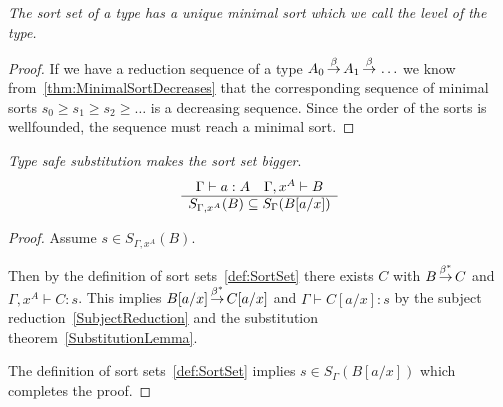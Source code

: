 \begin{theorem}
    \emph{The sort set of a type has a unique minimal sort which we call the
    level of the type.}

    \begin{proof}
        If we have a reduction sequence of a type $A_0 {\,\stackrel{\beta}{\to}\,} A_1 {\,\stackrel{\beta}{\to}\,}
        \ldots$ we know from~\ref{thm:MinimalSortDecreases} that the
        corresponding sequence of minimal sorts $s_0 \ge s_1 \ge s_2 \ge
        \ldots$ is a decreasing sequence. Since the order of the sorts is
        wellfounded, the sequence must reach a minimal sort.
    \end{proof}
\end{theorem}


\begin{theorem}
    \label{thm:SortSetSubstitution}
    \emph{Type safe substitution makes the sort set bigger}.
    $$
        \begin{array}{c} 
            \Gamma \vdash a : A \quad \Gamma,x^A \vdash B
         \\ \hline 
            S_{\Gamma,x^A}(B) \subseteq S_\Gamma(B[a/x])
        \end{array}
    $$
    \begin{proof}
        Assume $s \in S_{\Gamma,x^A}(B)$.

        Then by the definition of sort sets~\ref{def:SortSet}
        there exists $C$ with $B {\,\stackrel{\beta^*}{\to}\,} C$ and $\Gamma,x^A \vdash C: s$.
        This implies $B[a/x] {\,\stackrel{\beta^*}{\to}\,} C[a/x]$ and $\Gamma \vdash C[a/x] : s$
        by the subject reduction~\ref{SubjectReduction} and the substitution
        theorem~\ref{SubstitutionLemma}.

        The definition of sort sets~\ref{def:SortSet} implies $s \in
        S_\Gamma(B[a/x])$ which completes the proof.
    \end{proof}
\end{theorem}






